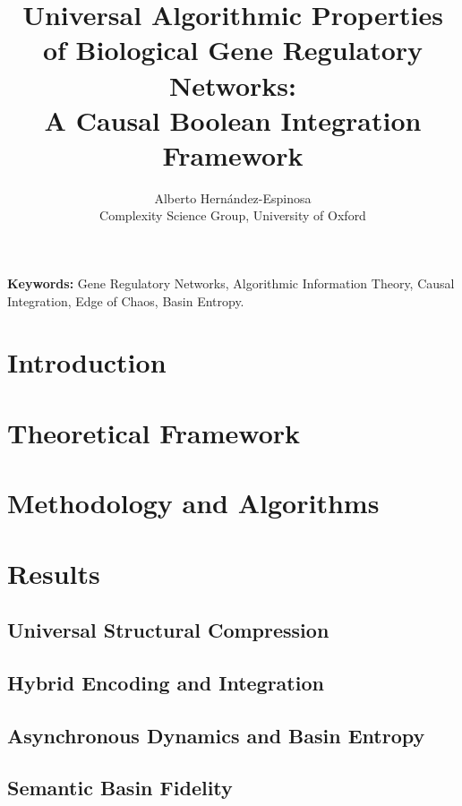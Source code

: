 \documentclass[10pt,a4paper]{article}
\title{\textbf{Universal Algorithmic Properties of Biological Gene Regulatory Networks: \\ A Causal Boolean Integration Framework}}
\author{Alberto Hern\'andez-Espinosa \\ \small{Complexity Science Group, University of Oxford}}
\date{}
\theoremstyle{plain}
\theoremstyle{definition}
\theoremstyle{remark}
\begin{document}
\maketitle



\vspace{1em}
\noindent\textbf{Keywords:} Gene Regulatory Networks, Algorithmic Information Theory, Causal Integration, Edge of Chaos, Basin Entropy.

\section{Introduction}


\section{Theoretical Framework}


\section{Methodology and Algorithms}


\section{Results}
\subsection{Universal Structural Compression}


\subsection{Hybrid Encoding and Integration}


\subsection{Asynchronous Dynamics and Basin Entropy}


\subsection{Semantic Basin Fidelity}

\end{document}
